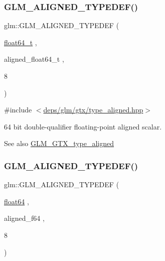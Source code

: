 \subsubsection{\texorpdfstring{G\+L\+M\+\_\+\+A\+L\+I\+G\+N\+E\+D\+\_\+\+T\+Y\+P\+E\+D\+E\+F()}{GLM\_ALIGNED\_TYPEDEF()}\hspace{0.1cm}{\footnotesize\ttfamily [141/209]}}
{\footnotesize\ttfamily glm\+::\+G\+L\+M\+\_\+\+A\+L\+I\+G\+N\+E\+D\+\_\+\+T\+Y\+P\+E\+D\+EF (\begin{DoxyParamCaption}\item[{\hyperlink{group__gtc__type__precision_gade966a3eb25ebeb16dd53c40d3fdeb46}{float64\+\_\+t}}]{,  }\item[{aligned\+\_\+float64\+\_\+t}]{,  }\item[{8}]{ }\end{DoxyParamCaption})}



{\ttfamily \#include $<$\hyperlink{gtx_2type__aligned_8hpp}{deps/glm/gtx/type\+\_\+aligned.\+hpp}$>$}

64 bit double-\/qualifier floating-\/point aligned scalar. \begin{DoxySeeAlso}{See also}
\hyperlink{group__gtx__type__aligned}{G\+L\+M\+\_\+\+G\+T\+X\+\_\+type\+\_\+aligned} 
\end{DoxySeeAlso}
\mbox{\label{group__gtx__type__aligned_gaa4deaa0dea930c393d55e7a4352b0a20}} 
\subsubsection{\texorpdfstring{G\+L\+M\+\_\+\+A\+L\+I\+G\+N\+E\+D\+\_\+\+T\+Y\+P\+E\+D\+E\+F()}{GLM\_ALIGNED\_TYPEDEF()}\hspace{0.1cm}{\footnotesize\ttfamily [142/209]}}
{\footnotesize\ttfamily glm\+::\+G\+L\+M\+\_\+\+A\+L\+I\+G\+N\+E\+D\+\_\+\+T\+Y\+P\+E\+D\+EF (\begin{DoxyParamCaption}\item[{\hyperlink{group__gtc__type__precision_gab721f828b41f46b20cf4883b50733d3b}{float64}}]{,  }\item[{aligned\+\_\+f64}]{,  }\item[{8}]{ }\end{DoxyParamCaption})}



